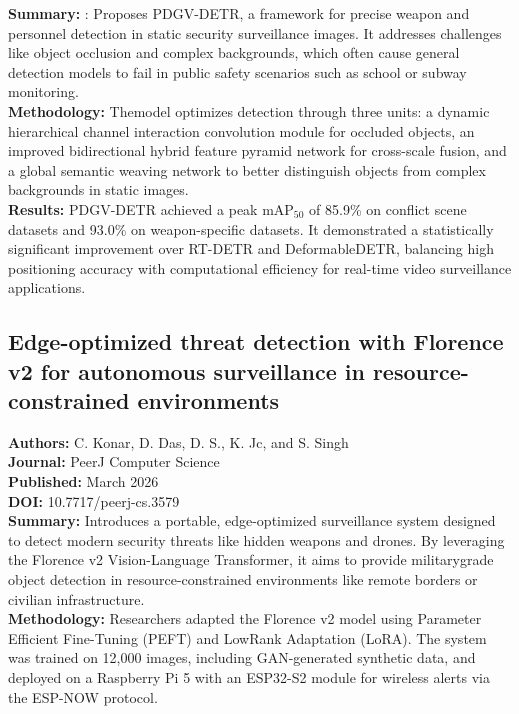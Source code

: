 \textbf{Summary:} : Proposes PDGV-DETR, a framework for precise weapon and personnel detection in
static security surveillance images. It addresses challenges like object occlusion and complex
backgrounds, which often cause general detection models to fail in public safety scenarios such as
school or subway monitoring. \\

\textbf{Methodology:} Themodel optimizes detection through three units: a dynamic hierarchical
channel interaction convolution module for occluded objects, an improved bidirectional hybrid
feature pyramid network for cross-scale fusion, and a global semantic weaving network to better
distinguish objects from complex backgrounds in static images. \\

\textbf{Results:} PDGV-DETR achieved a peak mAP$_{50}$ of 85.9\% on conflict scene datasets and
93.0\% on weapon-specific datasets. It demonstrated a statistically significant improvement over
RT-DETR and DeformableDETR, balancing high positioning accuracy with computational efficiency for
real-time video surveillance applications.

\subsection{Edge-optimized threat detection with Florence v2 for autonomous surveillance in
  resource-constrained environments}

\textbf{Authors:} C. Konar, D. Das, D. S., K. Jc, and S. Singh \\
\textbf{Journal:} PeerJ Computer Science \\
\textbf{Published:} March 2026 \\
\textbf{DOI:} 10.7717/peerj-cs.3579 \\

\textbf{Summary:} Introduces a portable, edge-optimized surveillance system designed to detect
modern security threats like hidden weapons and drones. By leveraging the Florence v2
Vision-Language Transformer, it aims to provide militarygrade object detection in
resource-constrained environments like remote borders or civilian infrastructure. \\

\textbf{Methodology:} Researchers adapted the Florence v2 model using Parameter Efficient
Fine-Tuning (PEFT) and LowRank Adaptation (LoRA). The system was trained on 12,000 images, including
GAN-generated synthetic data, and deployed on a Raspberry Pi 5 with an ESP32-S2 module for wireless
alerts via the ESP-NOW protocol. \\

